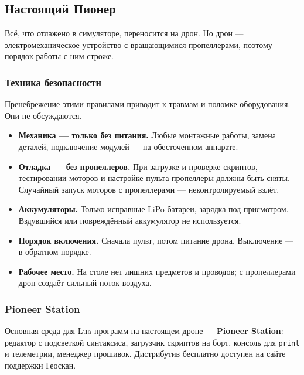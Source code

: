 \subsection{Настоящий Пионер}

Всё, что отлажено в симуляторе, переносится на дрон. Но дрон --- электромеханическое устройство с вращающимися пропеллерами, поэтому порядок работы с ним строже.

\subsubsection{Техника безопасности}

\begin{warnbox}
Пренебрежение этими правилами приводит к травмам и поломке оборудования. Они не обсуждаются.
\end{warnbox}

\begin{itemize}
    \item \textbf{Механика --- только без питания.} Любые монтажные работы, замена деталей, подключение модулей --- на обесточенном аппарате.
    \item \textbf{Отладка --- без пропеллеров.} При загрузке и проверке скриптов, тестировании моторов и настройке пульта пропеллеры должны быть сняты. Случайный запуск моторов с пропеллерами --- неконтролируемый взлёт.
    \item \textbf{Аккумуляторы.} Только исправные LiPo-батареи, зарядка под присмотром. Вздувшийся или повреждённый аккумулятор не используется.
    \item \textbf{Порядок включения.} Сначала пульт, потом питание дрона. Выключение --- в обратном порядке.
    \item \textbf{Рабочее место.} На столе нет лишних предметов и проводов; с пропеллерами дрон создаёт сильный поток воздуха.
\end{itemize}

\subsubsection{Pioneer Station}

Основная среда для Lua-программ на настоящем дроне --- \textbf{Pioneer Station}: редактор с подсветкой синтаксиса, загрузчик скриптов на борт, консоль для \texttt{print} и телеметрии, менеджер прошивок. Дистрибутив бесплатно доступен на сайте поддержки Геоскан.

